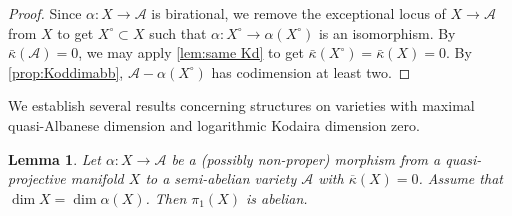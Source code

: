 \documentclass[11pt,english]{smfart}
\theoremstyle{plain}
\newtheorem{lem}[thm]{Lemma}
\theoremstyle{definition}
\theoremstyle{remark}
\numberwithin{equation}{section}
\theoremstyle{plain}
\newcommand{\cA}{\mathcal A}
\begin{document}
\begin{proof}
	Since $\alpha:X\to \cA$ is birational,  we remove the exceptional locus of $X\to \mathcal{A}$ from $X$ to get $X^\circ\subset X$ such that $\alpha: X^\circ\to \alpha(X^\circ)$ is an isomorphism. 
	By $\bar{\kappa}(\cA)=0$, we may apply \cref{lem:same Kd} to get $\bar{\kappa}(X^\circ)=\bar{\kappa}(X)=0$.  
	By \cref{prop:Koddimabb}, $\mathcal{A}-\alpha(X^\circ)$ has codimension  at least two. \end{proof}


We establish several results concerning structures on varieties with maximal quasi-Albanese dimension and logarithmic Kodaira dimension zero.

\begin{lem}\label{lem:abelian pi}
	Let $\alpha:X\to \cA$ be  a  (possibly non-proper)  morphism  from a quasi-projective manifold $X$ to a semi-abelian variety $\cA$ with   $\overline{\kappa}(X)=0$. 
	Assume that $\dim X=\dim \alpha(X)$.	
	Then  $ \pi_1(X)$ is   abelian.  
\end{lem}
\end{document}
